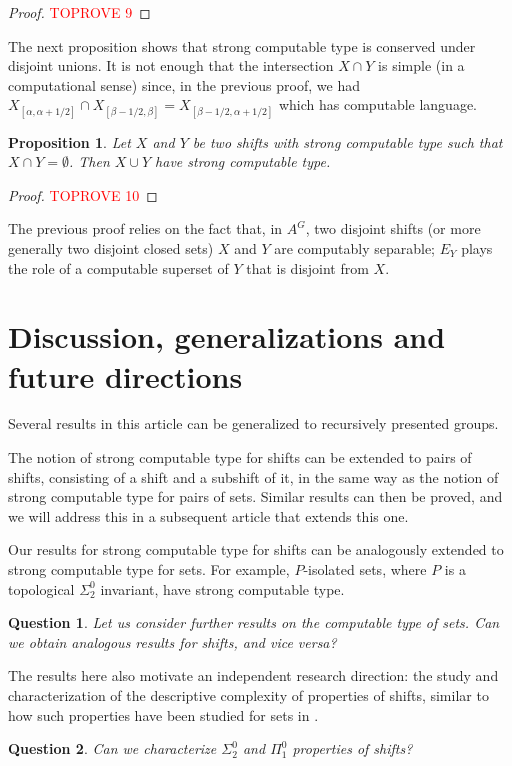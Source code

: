 \documentclass[french,american]{article}
\theoremstyle{plain}
\newtheorem{proposition}[theorem]{Proposition}
\theoremstyle{definition}
\theoremstyle{remark}
\theoremstyle{plain}
\newtheorem{question}{Question}
\begin{document}
\begin{proof}\textcolor{red}{TOPROVE 9}\end{proof}

The next proposition shows that strong computable type is conserved under disjoint unions. It is not enough that the intersection $X \cap Y$ is simple (in a computational sense) since, in the previous proof, we had $X_{[\alpha,\alpha+1/2]}\cap X_{[\beta-1/2,\beta]} = X_{[\beta-1/2,\alpha+1/2]}$ which has computable language.

\begin{proposition}
Let $X$ and $Y$ be two shifts with strong computable type such that $X\cap Y = \emptyset$. Then $X\cup Y$ have strong computable type.
\end{proposition}

\begin{proof}\textcolor{red}{TOPROVE 10}\end{proof}

The previous proof relies on the fact that, in $A^G$, two disjoint shifts  (or more generally two disjoint closed sets) $X$ and $Y$ are computably separable; $E_Y$ plays the role of a computable superset of $Y$ that is disjoint from $X$.


\section{Discussion, generalizations and future directions}\label{sec:Generalization,-conclusion-and}

Several results in this article can be generalized to recursively
presented groups.

The notion of strong computable type for shifts can be extended to
pairs of shifts, consisting of a shift and a subshift of it, in the
same way as the notion of strong computable type for pairs of sets.
Similar results can then be proved, and we will address this in a
subsequent article that extends this one.

Our results for strong computable type for shifts can be analogously
extended to strong computable type for sets. For example, $P$-isolated
sets, where $P$ is a topological $\Sigma_{2}^{0}$ invariant, have
strong computable type.
\begin{question}
Let us consider further results on the computable type of sets. Can
we obtain analogous results for shifts, and vice versa?
\end{question}

The results here also motivate an independent research direction:
the study and characterization of the descriptive complexity of properties
of shifts, similar to how such properties have been studied for sets
in \cite{AH22c,AMIR2025103611}.
\begin{question}
Can we characterize $\Sigma_{2}^{0}$ and $\Pi_{1}^{0}$ properties
of shifts?
\end{question}
\end{document}

